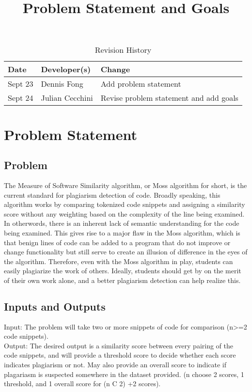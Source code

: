 \documentclass{article}
\title{Problem Statement and Goals\\\progname}
\author{\authname}
\date{}
\begin{document}
\maketitle

\begin{table}[hp]
\caption{Revision History} \label{TblRevisionHistory}
\begin{tabularx}{\textwidth}{llX}
\toprule
\textbf{Date} & \textbf{Developer(s)} & \textbf{Change}\\
\midrule
Sept 23 & Dennis Fong & Add problem statement\\
Sept 24 & Julian Cecchini & Revise problem statement and add goals\\
\bottomrule
\end{tabularx}
\end{table}

\section{Problem Statement}



\subsection{Problem}
The Measure of Software Similarity algorithm, or Moss algorithm for short, is the current standard for plagiarism detection of code. Broadly speaking, this algorithm works by comparing tokenized code snippets and assigning a similarity score without any weighting based on the complexity of the line being examined. In otherwords, there is an inherent lack of semantic understanding for the code being examined. This gives rise to a major flaw in the Moss algorithm, which is that benign lines of code can be added to a program that do not improve or change functionality but still serve to create an illusion of difference in the eyes of the algorithm. Therefore, even with the Moss algorithm in play, students can easily plagiarize the work of others. Ideally, students should get by on the merit of their own work alone, and a better plagiarism detection can help realize this.

\subsection{Inputs and Outputs}
Input: The problem will take two or more snippets of code for comparison (n>=2 code snippets). \\
Output: The desired output is a similarity score between every pairing of the code snippets, and will provide a threshold score to decide whether each score indicates plagiarism or not. May also provide an overall score to indicate if plagariasm is suspected somewhere in the dataset provided. (n choose 2 scores, 1 threshold, and 1 overall score for (n C 2) +2 scores). 
\end{document}
